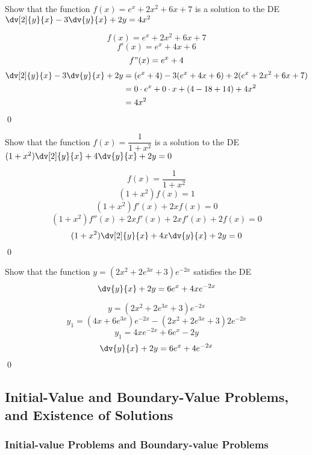 \begin{example}{
    Show that the function $f(x) = e^x+2x^2+6x+7$ is a solution to the DE $\dv[2]{y}{x} - 3\dv{y}{x} + 2y = 4x^2$ 
}

    \[ f(x) = e^x + 2x^2 + 6x + 7 \]
    \[ f'(x) = e^x + 4x + 6 \]
    \[ f"(x) = e^x + 4 \]
    \begin{align*}
        \dv[2]{y}{x} - 3\dv{y}{x} + 2y &= (e^x+4) - 3(e^x+4x+6) + 2(e^x+2x^2+6x+7) \\
        &= 0\cdot e^x + 0\cdot x + (4-18+14) + 4x^2 \\
        &= 4x^2
    \end{align*} \qed
\end{example}

\begin{example}{
    Show that the function $f(x) = \dfrac{1}{1+x^2}$ is a solution to the DE $(1+x^2)\dv[2]{y}{x} + 4\dv{y}{x} + 2y = 0$ 
}
    
    \[ f(x) = \frac{1}{1+x^2} \]
    \[ (1+x^2)f(x) = 1 \]
    \[ (1+x^2)f'(x) + 2xf(x) = 0 \]
    \[ (1+x^2)f''(x) + 2xf'(x) + 2xf'(x) + 2f(x) = 0 \]
    \[
        (1+x^2) \dv[2]{y}{x} + 4x \dv{y}{x} + 2y = 0
    \] \qed
\end{example}

\begin{example}{
    Show that the function $y = (2x^2+2e^{3x}+3)e^{-2x}$ satisfies the DE \[
        \dv{y}{x} + 2y = 6e^x + 4xe^{-2x}
    \]}
    
    \[ y = ( 2x^2 + 2e^{3x} + 3 ) e^{-2x} \]
    \[ y_1 = ( 4x + 6e^{3x} )e^{-2x} - ( 2x^2 + 2e^{3x} + 3 )2e^{-2x} \]
    \[ y_1 = 4xe^{-2x} + 6e^x - 2y \]
    \[
        \dv{y}{x} + 2y = 6e^x + 4e^{-2x}
    \] \qed
\end{example}




\subsection{Initial-Value and Boundary-Value Problems, and Existence of Solutions}


\subsubsection{Initial-value Problems and Boundary-value Problems}

